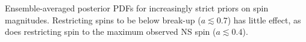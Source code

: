 Ensemble-averaged posterior PDFs for increasingly strict priors on spin magnitudes.  Restricting spins to be below break-up ($a\lesssim0.7$) has little effect, as does restricting spin to the maximum observed NS spin ($a\lesssim0.4$).